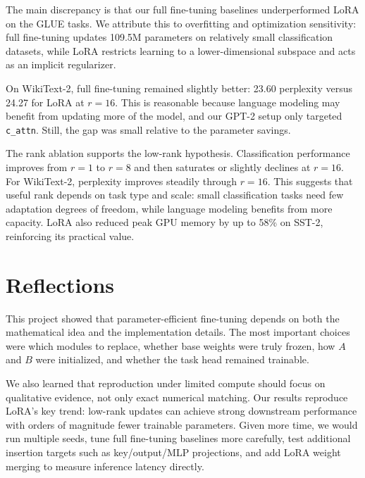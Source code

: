 \documentclass[11pt,twocolumn]{article}
\begin{document}
The main discrepancy is that our full fine-tuning baselines underperformed LoRA on the GLUE tasks. We attribute this to overfitting and optimization sensitivity: full fine-tuning updates 109.5M parameters on relatively small classification datasets, while LoRA restricts learning to a lower-dimensional subspace and acts as an implicit regularizer.

On WikiText-2, full fine-tuning remained slightly better: 23.60 perplexity versus 24.27 for LoRA at $r=16$. This is reasonable because language modeling may benefit from updating more of the model, and our GPT-2 setup only targeted \texttt{c\_attn}. Still, the gap was small relative to the parameter savings.

The rank ablation supports the low-rank hypothesis. Classification performance improves from $r=1$ to $r=8$ and then saturates or slightly declines at $r=16$. For WikiText-2, perplexity improves steadily through $r=16$. This suggests that useful rank depends on task type and scale: small classification tasks need few adaptation degrees of freedom, while language modeling benefits from more capacity. LoRA also reduced peak GPU memory by up to 58\% on SST-2, reinforcing its practical value.

\section{Reflections}
This project showed that parameter-efficient fine-tuning depends on both the mathematical idea and the implementation details. The most important choices were which modules to replace, whether base weights were truly frozen, how $A$ and $B$ were initialized, and whether the task head remained trainable.

We also learned that reproduction under limited compute should focus on qualitative evidence, not only exact numerical matching. Our results reproduce LoRA's key trend: low-rank updates can achieve strong downstream performance with orders of magnitude fewer trainable parameters. Given more time, we would run multiple seeds, tune full fine-tuning baselines more carefully, test additional insertion targets such as key/output/MLP projections, and add LoRA weight merging to measure inference latency directly.
\end{document}
